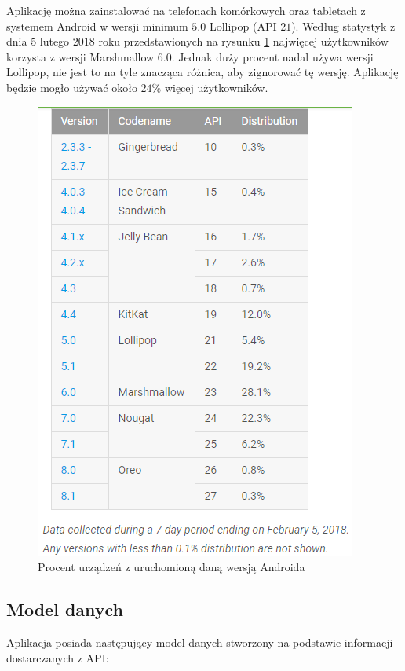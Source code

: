 \documentclass[twoside]{projektInzynierskiMS}
\begin{document}
Aplikację można zainstalować na telefonach komórkowych oraz tabletach z systemem Android w wersji minimum $5.0$ Lollipop (API $21$). Według statystyk z dnia $5$ lutego $2018$ roku \cite{androidStatistics} przedstawionych na rysunku \ref{fig:androidStats} najwięcej użytkowników korzysta z wersji Marshmallow $6.0$. Jednak duży procent nadal używa wersji Lollipop, nie jest to na tyle znacząca różnica, aby zignorować tę wersję. Aplikację będzie mogło używać około $24\%$ więcej użytkowników.    

\begin{figure}[h]
  \centering
  \includegraphics[width=0.6\linewidth]{img/android/stats.png}
  \caption{Procent urządzeń z uruchomioną daną wersją Androida}
  \label{fig:androidStats}
\end{figure}

\subsection{Model danych}
Aplikacja posiada następujący model danych stworzony na podstawie informacji dostarczanych z API:
\end{document}
